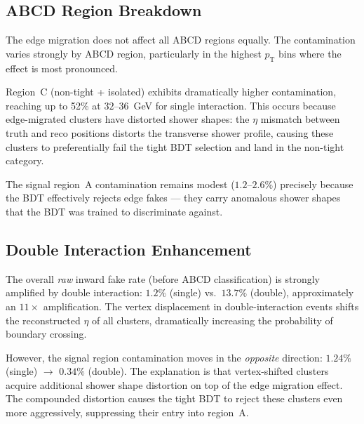 \documentclass[11pt,letterpaper]{article}
\newcommand{\pT}{\ensuremath{p_{\text{T}}}}
\begin{document}
\subsection{ABCD Region Breakdown}
\label{sec:abcd}

The edge migration does not affect all ABCD regions equally.
The contamination varies strongly by ABCD region, particularly in the
highest $\pT$ bins where the effect is most pronounced.

Region~C (non-tight + isolated) exhibits dramatically higher contamination,
reaching up to 52\% at $32$--$36$~GeV for single interaction. This occurs
because edge-migrated clusters have distorted shower shapes: the $\eta$
mismatch between truth and reco positions distorts the transverse shower profile,
causing these clusters to preferentially fail the tight BDT selection and land in
the non-tight category.

The signal region~A contamination remains modest ($1.2$--$2.6\%$) precisely
because the BDT effectively rejects edge fakes --- they carry anomalous shower
shapes that the BDT was trained to discriminate against.

\subsection{Double Interaction Enhancement}
\label{sec:double_enhancement}

The overall \emph{raw} inward fake rate (before ABCD classification) is strongly
amplified by double interaction: $1.2\%$ (single) vs.\ $13.7\%$ (double),
approximately an $11\times$ amplification. The vertex displacement in
double-interaction events shifts the reconstructed $\eta$ of all clusters,
dramatically increasing the probability of boundary crossing.

However, the signal region contamination moves in the \emph{opposite} direction:
$1.24\%$ (single) $\to$ $0.34\%$ (double). The explanation is that
vertex-shifted clusters acquire additional shower shape distortion on top of the
edge migration effect. The compounded distortion causes the tight BDT to reject
these clusters even more aggressively, suppressing their entry into region~A.
\end{document}

